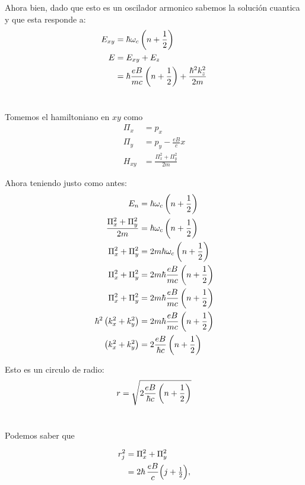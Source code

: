 \documentclass{report}
\begin{document}
Ahora bien, dado que esto es un oscilador armonico sabemos la solución cuantica y que esta responde a:
\begin{align*}
  E_{xy} &= \hbar\omega_c\left(n + \frac{1}{2}\right)\\
  E &= E_{xy} + E_z\\
  &= \hbar\frac{eB}{mc}\left(n + \frac{1}{2}\right) + \frac{\hbar^2k_z^2}{2m}
\end{align*}

\section{}

Tomemos el hamiltoniano en $xy$ como
\begin{align*}
  \Pi_x &= p_x\\
  \Pi_y &= p_y - \frac{e B}{c}x\\
  H_{xy} &= \frac{\Pi_x^2 + \Pi_y^2}{2m}
\end{align*}

Ahora teniendo justo como antes:
\begin{align*}
  E_n &= \hbar\omega_c\left(n + \frac{1}{2}\right)\\
  \frac{\Pi_x^2 + \Pi_y^2}{2m} &= \hbar\omega_c\left(n + \frac{1}{2}\right)\\
  \Pi_x^2 + \Pi_y^2 &= 2m\hbar\omega_c\left(n + \frac{1}{2}\right)\\
  \Pi_x^2 + \Pi_y^2 &= 2m\hbar\frac{eB}{mc}\left(n + \frac{1}{2}\right)\\
  \Pi_x^2 + \Pi_y^2 &= 2m\hbar\frac{eB}{mc}\left(n + \frac{1}{2}\right)\\
  \hbar^2\left(k_x^2 + k_y^2\right) &= 2m\hbar\frac{eB}{mc}\left(n + \frac{1}{2}\right)\\
  \left(k_x^2 + k_y^2\right) &= 2\frac{eB}{\hbar c}\left(n + \frac{1}{2}\right)\\
\end{align*}

Esto es un circulo de radio:
\[
  r = \sqrt{2\frac{eB}{\hbar c}\left(n + \frac{1}{2}\right)}
\]

\section{}

Podemos saber que

\begin{align*}
r_j^2 &= \Pi_x^2 + \Pi_y^2\\
  &= 2\hbar\,\frac{eB}{c}\Bigl(j + \tfrac12\Bigr),
\end{align*}
\end{document}
